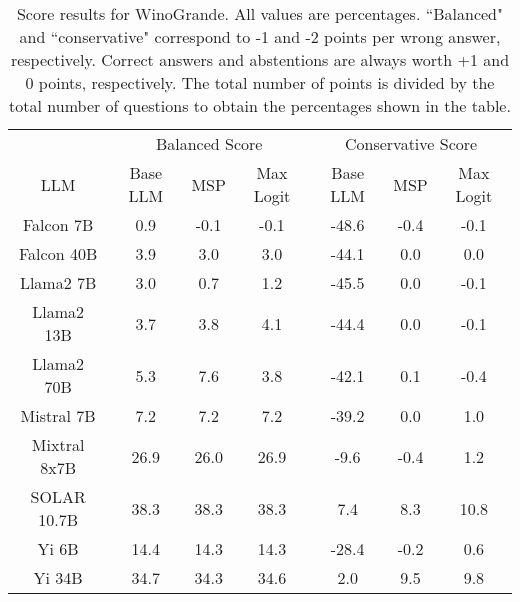 \begin{table*}
\centering
\begin{tabular}{c|c|c|c|c|c|c}
& \multicolumn{3}{c|}{Balanced Score} & \multicolumn{3}{c}{Conservative Score} \\ 
LLM & Base LLM & MSP & Max Logit & Base LLM & MSP & Max Logit\\ \hline
Falcon 7B & 0.9 & -0.1 & -0.1 & -48.6 & -0.4 & -0.1\\
Falcon 40B & 3.9 & 3.0 & 3.0 & -44.1 & 0.0 & 0.0\\
Llama2 7B & 3.0 & 0.7 & 1.2 & -45.5 & 0.0 & -0.1\\
Llama2 13B & 3.7 & 3.8 & 4.1 & -44.4 & 0.0 & -0.1\\
Llama2 70B & 5.3 & 7.6 & 3.8 & -42.1 & 0.1 & -0.4\\
Mistral 7B & 7.2 & 7.2 & 7.2 & -39.2 & 0.0 & 1.0\\
Mixtral 8x7B & 26.9 & 26.0 & 26.9 & -9.6 & -0.4 & 1.2\\
SOLAR 10.7B & 38.3 & 38.3 & 38.3 & 7.4 & 8.3 & 10.8\\
Yi 6B & 14.4 & 14.3 & 14.3 & -28.4 & -0.2 & 0.6\\
Yi 34B & 34.7 & 34.3 & 34.6 & 2.0 & 9.5 & 9.8\\
\hline
\end{tabular}
\caption{Score results for WinoGrande. All values are percentages. ``Balanced" and ``conservative" correspond to -1 and -2 points per wrong answer, respectively. Correct answers and abstentions are always worth +1 and 0 points, respectively. The total number of points is divided by the total number of questions to obtain the percentages shown in the table.}
\label{tab:winogrande_score}
\end{table*}
